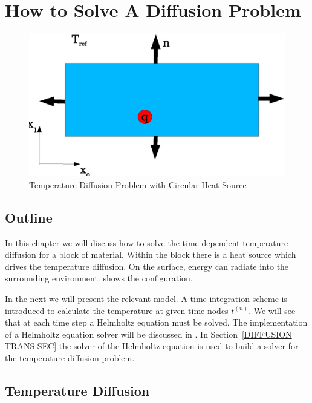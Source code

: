 \chapter{How to Solve A Diffusion Problem}
\label{DIFFUSION CHAP}

\begin{figure}
\centerline{\includegraphics[width=\figwidth]{DiffusionDomain}}
\caption{Temperature Diffusion Problem with Circular Heat Source}
\label{DIFFUSION FIG 1}
\end{figure}

\section{\label{DIFFUSION OUT SEC}Outline}
In this chapter we will discuss how to solve the time dependent-temperature diffusion for
a block of material. Within the block there is a heat source which drives the temperature diffusion.
On the surface, energy can radiate into the surrounding environment.
 shows the configuration.

In the next  we will present the relevant model. A 
time integration scheme is introduced to calculate the temperature at given time nodes $t^{(n)}$. 
We will see that at each time step a Helmholtz equation  
must be solved. 
The implementation of a Helmholtz equation solver will be discussed in . 
In Section~\ref{DIFFUSION TRANS SEC} the solver of the Helmholtz equation is used to build a
solver for the temperature diffusion problem. 

\section{\label{DIFFUSION TEMP SEC}Temperature Diffusion}

